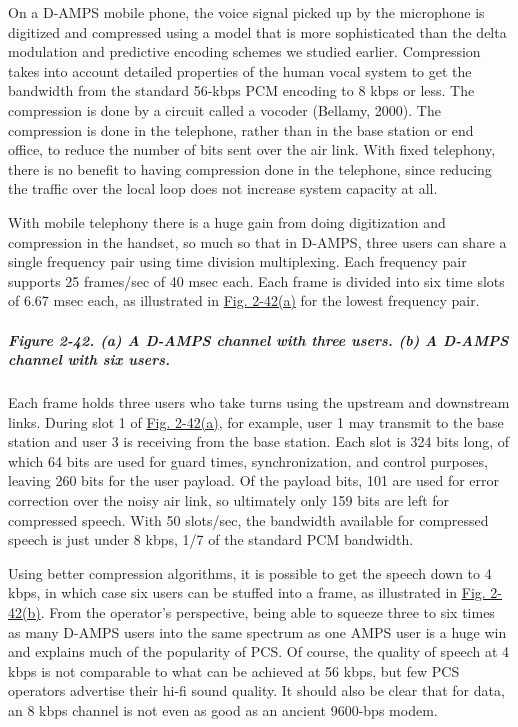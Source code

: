 On a D-AMPS mobile phone, the voice signal picked up by the microphone
is digitized and compressed using a model that is more sophisticated
than the delta modulation and predictive encoding schemes we studied
earlier. Compression takes into account detailed properties of the human
vocal system to get the bandwidth from the standard 56-kbps PCM encoding
to 8 kbps or less. The compression is done by a circuit called a
{vocoder} (Bellamy, 2000). The compression is done in the telephone,
rather than in the base station or end office, to reduce the number of
bits sent over the air link. With fixed telephony, there is no benefit
to having compression done in the telephone, since reducing the traffic
over the local loop does not increase system capacity at all.

With mobile telephony there is a huge gain from doing digitization and
compression in the handset, so much so that in D-AMPS, three users can
share a single frequency pair using time division multiplexing. Each
frequency pair supports 25 frames/sec of 40 msec each. Each frame is
divided into six time slots of 6.67 msec each, as illustrated in
\protect\hyperlink{0130661023_ch02lev1sec6.htmlux5cux23ch02fig42}{Fig.
2-42(a)} for the lowest frequency pair.

\subparagraph[Figure 2-42. (a) A D-AMPS channel with three users. (b) A
D-AMPS channel with six
users.]{\texorpdfstring{\protect\hypertarget{0130661023_ch02lev1sec6.htmlux5cux23ch02fig42}{}{}Figure
2-42. (a) A D-AMPS channel with three users. (b) A D-AMPS channel with
six
users.}{Figure 2-42. (a) A D-AMPS channel with three users. (b) A D-AMPS channel with six users.}}


Each frame holds three users who take turns using the upstream and
downstream links. During slot 1 of
\protect\hyperlink{0130661023_ch02lev1sec6.htmlux5cux23ch02fig42}{Fig.
2-42(a)}, for example, user 1 may transmit to the base station and user
3 is receiving from the base station. Each slot is 324 bits long, of
which 64 bits are used for guard times, synchronization, and control
purposes, leaving 260 bits for the user payload. Of the payload bits,
101 are used for error correction over the noisy air link, so ultimately
only 159 bits are left for compressed speech. With 50 slots/sec, the
bandwidth available for compressed speech is just under 8 kbps, 1/7 of
the standard PCM bandwidth.

Using better compression algorithms, it is possible to get the speech
down to 4 kbps, in which case six users can be stuffed into a frame, as
illustrated in
\protect\hyperlink{0130661023_ch02lev1sec6.htmlux5cux23ch02fig42}{Fig.
2-42(b)}. From the operator's perspective, being able to squeeze three
to six times as many D-AMPS users into the same spectrum as one AMPS
user is a huge win and explains much of the popularity of PCS. Of
course, the quality of speech at 4 kbps is not comparable to what can be
achieved at 56 kbps, but few PCS operators advertise their hi-fi sound
quality. It should also be clear that for data, an 8 kbps channel is not
even as good as an ancient 9600-bps modem.

